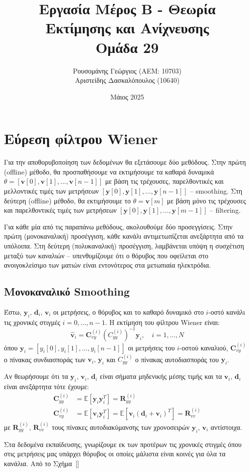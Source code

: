 \documentclass[a4paper,12pt]{article}
\title{Εργασία Μέρος Β - Θεωρία Εκτίμησης και Ανίχνευσης \\ Ομάδα 29}
\author{Ρουσομάνης Γεώργιος (ΑΕΜ: 10703) \\ Αριστείδης Δασκαλόπουλος (10640)}
\date{Μάιος 2025}
\begin{document}
\maketitle

\section*{Εύρεση φίλτρου Wiener}

Για την αποθορυβοποίηση των δεδομένων θα εξετάσουμε δύο μεθόδους. Στην πρώτη 
(offline) μέθοδο, θα προσπαθήσουμε να 
εκτιμήσουμε τα καθαρά δυναμικά 
$\theta = [\mathbf{v}[0], \mathbf{v}[1], \ldots, \mathbf{v}[n-1]]$
με βάση τις τρέχουσες, παρελθοντικές και μελλοντικές τιμές των μετρήσεων 
$[\mathbf{y}[0], \mathbf{y}[1], \ldots, \mathbf{y}[n-1]]$ 
-- smoothing. Στη δεύτερη 
(offline) μέθοδο, θα εκτιμήσουμε το 
$\theta = \mathbf{v}[m]$ με βάση μόνο τις τρέχουσες και παρελθοντικές τιμές των μετρήσεων 
$[\mathbf{y}[0], \mathbf{y}[1], \ldots, \mathbf{y}[m-1]]$
-- filtering.

Για κάθε μία από τις παραπάνω μεθόδους, ακολουθούμε δύο προσεγγίσεις. Στην πρώτη (μονοκαναλική) προσέγγιση, 
κάθε κανάλι αντιμετωπίζεται ανεξάρτητα από τα υπόλοιπα. Στη δεύτερη (πολυκαναλική) προσέγγιση, λαμβάνεται 
υπόψη η συσχέτιση μεταξύ των καναλιών – υπενθυμίζουμε ότι ο θόρυβος που οφείλεται στο ανοιγοκλείσιμο των 
ματιών είναι εντονότερος στα μετωπιαία ηλεκτρόδια.

\subsection*{Μονοκαναλικό Smoothing}
Έστω, $\mathbf{y}_i, \, \mathbf{d}_i, \, \mathbf{v}_i$
οι μετρήσεις, ο θόρυβος και το καθαρό δυναμικό στο $i$-οστό κανάλι τις χρονικές στιγμές $i=0,...,n-1$. 
Η εκτίμηση του φίλτρου Wiener είναι:
\[
\hat{\mathbf{v}}_i = \mathbf{C}_{vy}^{(i)}\left(C_{yy}^{(i)}\right)^{-1}\mathbf{y}_i, \quad i = 1,...,N
\]
όπου $\mathbf{y}_i = [y_i[0], y_i[1], \ldots, y_i[n-1]]$ οι μετρήσεις του $i$-οστού καναλιού,
$\mathbf{C}_{vy}^{(i)}$ ο πίνακας συνδιασποράς των $\mathbf{v}_i, \, \mathbf{y}_i$ και $C_{yy}^{(i)}$
ο πίνακας αυτοδιασποράς του $\mathbf{y}_i$.

Αν θεωρήσουμε ότι τα $\mathbf{y}_i, \, \mathbf{v}_i, \, \mathbf{d}_i$ είναι σήματα μηδενικής μέσης τιμής
και τα $\mathbf{v}_i, \, \mathbf{d}_i$ είναι ανεξάρτητα τότε έχουμε:
\[
\begin{aligned}
    \mathbf{C}_{yy}^{(i)} &= \mathbb{E}[\mathbf{y}_i\mathbf{y}_i^T] = \mathbf{R}_{yy}^{(i)} \\
    \mathbf{C}_{vy}^{(i)} &= \mathbb{E}[\mathbf{v}_i\mathbf{y}_i^T] = 
    \mathbb{E}[\mathbf{v}_i(\mathbf{d}_i + \mathbf{v}_i)^T] = \mathbf{R}_{vv}^{(i)}
\end{aligned}
\]
με $\mathbf{R}_{yy}^{(i)}, \, \mathbf{R}_{vv}^{(i)}$ τους πίνακες αυτοδιακύμανσης των χρονοσειρών
$\mathbf{y}_i, \, \mathbf{v}_i$ αντίστοιχα.

Στα δεδομένα εκπαίδευσης, γνωρίζουμε εκ των προτέρων τις χρονικές στιγμές όπου στις μετρήσεις μας υπάρχει
θόρυβος οι οποίες μάλιστα είναι κοινές για όλα τα κανάλια. Από το Σχήμα~\ref{}
\end{document}
